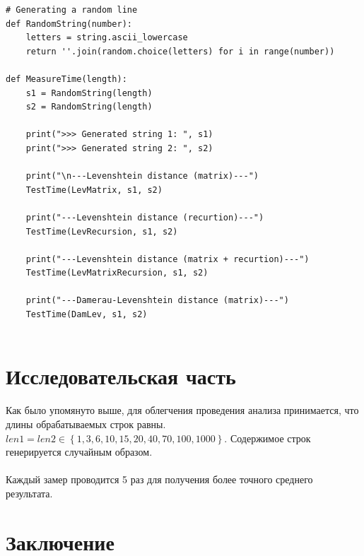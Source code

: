 \documentclass[12pt]{report}
\begin{document}
\begin{lstlisting}[label=some-code, caption = Замеры процессорного времени]
# Generating a random line
def RandomString(number):
	letters = string.ascii_lowercase
	return ''.join(random.choice(letters) for i in range(number))

def MeasureTime(length):
	s1 = RandomString(length)
	s2 = RandomString(length)
	
	print(">>> Generated string 1: ", s1)
	print(">>> Generated string 2: ", s2)
	
	print("\n---Levenshtein distance (matrix)---")
	TestTime(LevMatrix, s1, s2)
	
	print("---Levenshtein distance (recurtion)---")
	TestTime(LevRecursion, s1, s2)
	
	print("---Levenshtein distance (matrix + recurtion)---")
	TestTime(LevMatrixRecursion, s1, s2)
	
	print("---Damerau-Levenshtein distance (matrix)---")
	TestTime(DamLev, s1, s2)
	
\end{lstlisting}

\chapter{Исследовательская часть}
Как было упомянуто выше, для облегчения проведения анализа принимается, что длины обрабатываемых строк равны. $len1 = len2 \in \left\lbrace 1, 3, 6, 10, 15, 20, 40, 70, 100, 1000\right\rbrace$. Содержимое строк генерируется случайным образом. \\
\\
Каждый замер проводится 5 раз для получения более точного среднего результата.



\chapter*{Заключение}
\end{document}
